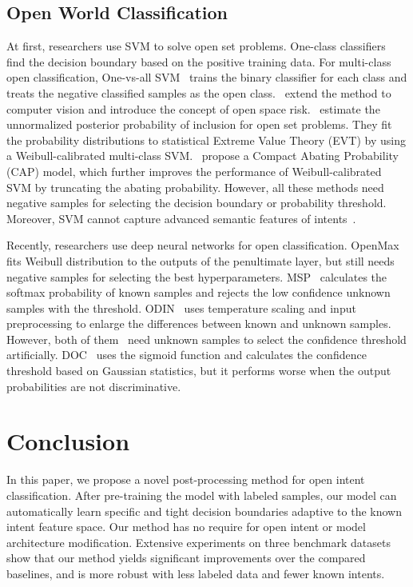 \documentclass[letterpaper]{article} %
\begin{document}
\subsection{Open World Classification}
At first, researchers use SVM to solve open set problems. One-class classifiers~\cite{scholkopf2001estimating,SVDD} find the decision boundary based on the positive training data. For multi-class open classification, One-vs-all SVM~\cite{Rifkin2004In} trains the binary classifier for each class and treats the negative classified samples as the open class.~\citet{scheirer2013toward} extend the method to computer vision and introduce the concept of open space risk.~\citet{Jain_2014_ECCV} estimate the unnormalized posterior probability of inclusion for open set problems. They fit the probability distributions to statistical Extreme Value Theory (EVT) by using a Weibull-calibrated multi-class SVM.~\citet{Scheirer_2014_TPAMIb} propose a Compact Abating Probability (CAP) model, which further improves the performance of Weibull-calibrated SVM by truncating the abating probability. However, all these methods need negative samples for selecting the decision boundary or probability threshold. Moreover, SVM cannot capture  advanced semantic features of intents~\cite{lin2019post}.

Recently, researchers use deep neural networks for open classification. OpenMax~\cite{bendale2016towards} fits Weibull distribution to the outputs of the penultimate layer, but still needs negative samples for selecting the best hyperparameters. MSP~\cite{hendrycks17baseline} calculates the softmax probability of known samples and rejects the low confidence unknown samples with the threshold. ODIN~\cite{liang2018enhancing} uses temperature scaling and input preprocessing to enlarge the differences between known and unknown samples. However, both of them~\cite{hendrycks17baseline,liang2018enhancing} need unknown samples to select the confidence threshold  artificially. DOC~\cite{Shu2017DOCDO} uses the sigmoid function and calculates the confidence threshold based on Gaussian statistics, but it performs worse when the output probabilities are not discriminative.

\section{Conclusion}
In this paper, we propose a novel post-processing method for open intent classification. After pre-training the model with labeled samples, our model can automatically learn specific and tight decision boundaries adaptive to the known intent feature space. Our method has no require for open intent or model architecture modification. Extensive experiments on three benchmark datasets show that our method yields significant improvements over the compared baselines, and is more robust with less labeled data and fewer known intents.
\end{document}
